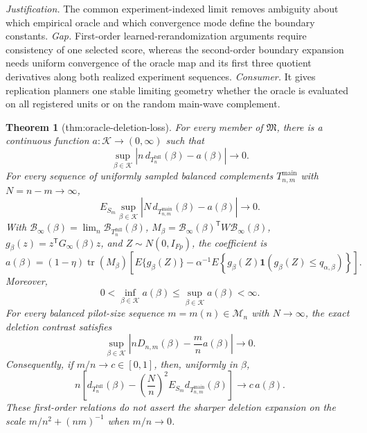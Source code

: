 \documentclass{article}
\newtheorem{theorem}{Theorem}
\begin{document}
\par\smallskip\noindent \textit{Justification.} The common experiment-indexed limit removes ambiguity about which empirical oracle and which convergence mode define the boundary constants. \textit{Gap.} First-order learned-rerandomization arguments require consistency of one selected score, whereas the second-order boundary expansion needs uniform convergence of the oracle map and its first three quotient derivatives along both realized experiment sequences. \textit{Consumer.} It gives replication planners one stable limiting geometry whether the oracle is evaluated on all registered units or on the random main-wave complement.

\begin{theorem}[thm:oracle-deletion-loss]\label{thm:oracle-deletion-loss}
For every member of \(\mathfrak M\), there is a continuous function \(a:\mathcal K\to(0,\infty)\) such that
\[
\sup_{\beta\in\mathcal K}
\left|n\,d_{T_n^{\mathrm{full}}}(\beta)-a(\beta)\right|\longrightarrow0.
\]
For every sequence of uniformly sampled balanced complements \(T_{n,m}^{\mathrm{main}}\) with \(N=n-m\to\infty\),
\[
E_{S_m}\sup_{\beta\in\mathcal K}
\left|N\,d_{T_{n,m}^{\mathrm{main}}}(\beta)-a(\beta)\right|\longrightarrow0.
\]
With \(\mathcal B_\infty(\beta)=\lim_n\mathcal B_{T_n^{\mathrm{full}}}(\beta)\), \(M_\beta=\mathcal B_\infty(\beta)^{\mathsf T}W\mathcal B_\infty(\beta)\), \(g_\beta(z)=z^{\mathsf T}G_\infty(\beta)z\), and \(Z\sim N(0,I_{Fp})\), the coefficient is
\[
a(\beta)
=(1-\eta)\operatorname{tr}(M_\beta)
\left[
E\{g_\beta(Z)\}
-\alpha^{-1}E\!\left\{g_\beta(Z)
\mathbf 1\!\left(g_\beta(Z)\leq q_{\alpha,\beta}\right)\right\}
\right].
\]
Moreover,
\[
0<\inf_{\beta\in\mathcal K}a(\beta)
\leq\sup_{\beta\in\mathcal K}a(\beta)<\infty.
\]
For every balanced pilot-size sequence \(m=m(n)\in\mathcal M_n\) with \(N\to\infty\), the exact deletion contrast satisfies
\[
\sup_{\beta\in\mathcal K}
\left|nD_{n,m}(\beta)-\frac mn a(\beta)\right|
\longrightarrow0.
\]
Consequently, if \(m/n\to c\in[0,1]\), then, uniformly in \(\beta\),
\[
n\left[
d_{T_n^{\mathrm{full}}}(\beta)
-\left(\frac{N}{n}\right)^2
E_{S_m}d_{T_{n,m}^{\mathrm{main}}}(\beta)
\right]\longrightarrow c\,a(\beta).
\]
These first-order relations do not assert the sharper deletion expansion on the scale \(m/n^2+(nm)^{-1}\) when \(m/n\to0\).
\end{theorem}
\end{document}

